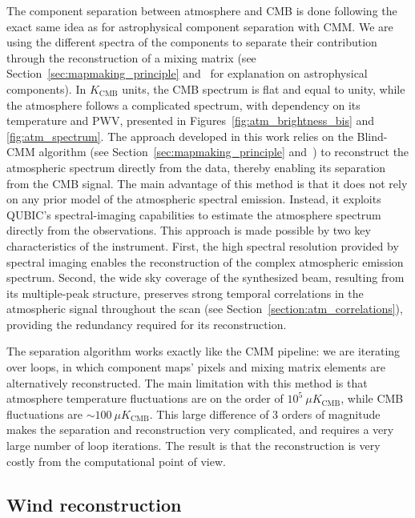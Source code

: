 \documentclass[a4paper,11pt]{article}
\begin{document}
The component separation between atmosphere and CMB is done following the exact same idea as for astrophysical component separation with CMM. We are using the different spectra of the components to separate their contribution through the reconstruction of a mixing matrix (see Section~\ref{sec:mapmaking_principle} and~\cite{cmm} for explanation on astrophysical components). In $K_\text{CMB}$ units, the CMB spectrum is flat and equal to unity, while the atmosphere follows a complicated spectrum, with dependency on its temperature and PWV, presented in Figures~\ref{fig:atm_brightness_bis} and \ref{fig:atm_spectrum}.
The approach developed in this work relies on the Blind-CMM algorithm (see Section~\ref{sec:mapmaking_principle} and~\cite{cmm}) to reconstruct the atmospheric spectrum directly from the data, thereby enabling its separation from the CMB signal. The main advantage of this method is that it does not rely on any prior model of the atmospheric spectral emission. Instead, it exploits QUBIC's spectral-imaging capabilities to estimate the atmosphere spectrum directly from the observations. This approach is made possible by two key characteristics of the instrument. First, the high spectral resolution provided by spectral imaging enables the reconstruction of the complex atmospheric emission spectrum. Second, the wide sky coverage of the synthesized beam, resulting from its multiple-peak structure, preserves strong temporal correlations in the atmospheric signal throughout the scan (see Section~\ref{section:atm_correlations}), providing the redundancy required for its reconstruction.

The separation algorithm works exactly like the CMM pipeline: we are iterating over loops, in which component maps' pixels and mixing matrix elements are alternatively reconstructed. The main limitation with this method is that atmosphere temperature fluctuations are on the order of $10^{5}~\mu K_\text{CMB}$, while CMB fluctuations are $\sim 100~\mu K_\text{CMB}$. This large difference of $3$ orders of magnitude makes the separation and reconstruction very complicated, and requires a very large number of loop iterations. The result is that the reconstruction is very costly from the computational point of view.

\subsection{Wind reconstruction}
\label{sec:wind_reconstruction}
\end{document}
